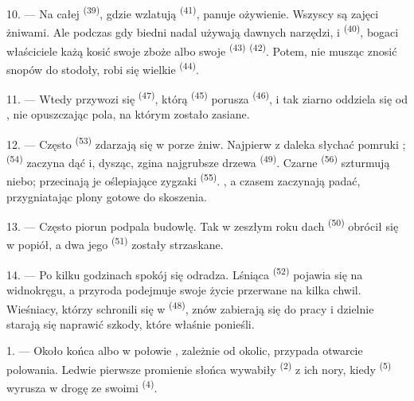 10. --- Na całej  \textsuperscript{(39)}, gdzie wzlatują
 \textsuperscript{(41)}, panuje ożywienie. Wszyscy są zajęci żniwami.
Ale podczas gdy biedni nadal używają dawnych narzędzi,  i
 \textsuperscript{(40)}, bogaci właściciele każą kosić swoje zboże albo
swoje  \textsuperscript{(43)}  \textsuperscript{(42)}.
Potem, nie musząc znosić snopów do stodoły, robi się wielkie 
\textsuperscript{(44)}.

11. --- Wtedy przywozi się  \textsuperscript{(47)}, którą
 \textsuperscript{(45)} porusza 
\textsuperscript{(46)}, i tak ziarno oddziela się od , nie opuszczając
pola, na którym zostało zasiane.

\VUsaut{5.0mm}
\VUsaut{3.4mm}

12. --- Często  \textsuperscript{(53)} zdarzają się w porze żniw.
Najpierw z daleka słychać pomruki ; 
\textsuperscript{(54)} zaczyna dąć i, dysząc, zgina najgrubsze drzewa 
\textsuperscript{(49)}. Czarne  \textsuperscript{(56)} szturmują
niebo; przecinają je oślepiające zygzaki  \textsuperscript{(55)}.
, a czasem  zaczynają padać, przygniatając plony gotowe do
skoszenia.

13. --- Często piorun podpala budowlę. Tak w zeszłym roku dach 
\textsuperscript{(50)} obrócił się w popiół, a dwa jego 
\textsuperscript{(51)} zostały strzaskane.

14. --- Po kilku godzinach spokój się odradza. Lśniąca 
\textsuperscript{(52)} pojawia się na widnokręgu, a przyroda podejmuje swoje życie
przerwane na kilka chwil. Wieśniacy, którzy schronili się w 
\textsuperscript{(48)}, znów zabierają się do pracy i dzielnie starają się naprawić
szkody, które właśnie ponieśli.

\VUsaut{6.0mm}
\VUsaut{3.6mm}

\VUsaut{1.4mm}
\VUsaut{4.0mm}

1. --- Około końca  albo w połowie , zależnie od
okolic, przypada otwarcie polowania. Ledwie pierwsze promienie słońca wywabiły
 \textsuperscript{(2)} z ich nory, kiedy 
\textsuperscript{(5)} wyrusza w drogę ze swoimi  \textsuperscript{(4)}.

